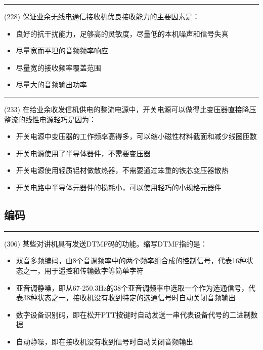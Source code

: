 \documentclass[twocolumn,hyperref,UTF8]{ctexart}  %
\begin{document}
\noindent\rule{0.5\textwidth}{1pt}
\heiti (228) 保证业余无线电通信接收机优良接收能力的主要因素是： \songti {\color{gray} [LK0422] }
\begin{itemize}
	\item  良好的抗干扰能力，足够高的灵敏度，尽量低的本机噪声和信号失真
	\item  尽量宽而平坦的音频频率响应
	\item  尽量宽的接收频率覆盖范围
	\item  尽量大的音频输出功率
\end{itemize}


\noindent\rule{0.5\textwidth}{1pt}
\heiti (233) 在给业余收发信机供电的整流电源中，开关电源可以做得比变压器直接降压整流的线性电源轻巧是因为： \songti {\color{gray} [LK0689] }
\begin{itemize}
	\item  开关电源中变压器的工作频率高得多，可以缩小磁性材料截面和减少线圈匝数
	\item  开关电源使用了半导体器件，不需要变压器
	\item  开关电源使用轻质铝材做散热器，不需要通过笨重的铁芯变压器散热
	\item  开关电路中半导体元器件的损耗小，可以使用轻巧的小规格元器件
\end{itemize}




\clearpage
\subsection{编码}


\noindent\rule{0.5\textwidth}{1pt}
\heiti (306) 某些对讲机具有发送DTMF码的功能。缩写DTMF指的是： \songti {\color{gray} [LK0261] }
\begin{itemize}
	\item  双音多频编码，由8个音调频率中的两个频率组合成的控制信号，代表16种状态之一，用于遥控和传输数字等简单字符
	\item  亚音调静噪，即从67-250.3Hz的38个亚音调频率中选取一个作为选通信号，代表38种状态之一，接收机没有收到特定的选通信号时自动关闭音频输出
	\item  数字设备识别码，即在松开PTT按键时自动发送一串代表设备代号的二进制数据
	\item  自动静噪，即在接收机没有收到信号时自动关闭音频输出
\end{itemize}



\clearpage
\end{document}
